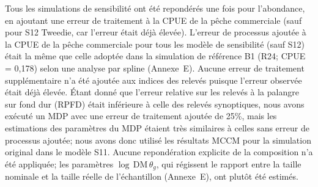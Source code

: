 \documentclass[11pt]{book}
\newcommand{\AppEqn}{Annexe~E}
\newcommand{\pc}{\%}
\begin{document}
Tous les simulations de sensibilit\'{e} ont \'{e}t\'{e} repond\'{e}r\'{e}s une fois pour l'abondance, en ajoutant une erreur de traitement \`{a} la CPUE de la p\^{e}che commerciale (sauf pour S12 Tweedie, car l'erreur \'{e}tait d\'{e}j\`{a} \'{e}lev\'{e}e). 
L'erreur de processus ajout\'{e}e \`{a} la CPUE de la p\^{e}che commerciale pour tous les mod\`{e}le de sensibilit\'{e} (sauf S12) \'{e}tait la m\^{e}me que celle adopt\'{e}e dans la simulation de r\'{e}f\'{e}rence B1 (R24; CPUE = 0,178) selon une analyse par spline (\AppEqn).
Aucune erreur de traitement suppl\'{e}mentaire n'a \'{e}t\'{e} ajout\'{e}e aux indices des relev\'{e}s puisque l'erreur observ\'{e}e \'{e}tait d\'{e}j\`{a} \'{e}lev\'{e}e. \'{E}tant donn\'{e} que l'erreur relative sur les relev\'{e}s \`{a} la palangre sur fond dur (RPFD) \'{e}tait inf\'{e}rieure \`{a} celle des relev\'{e}s synoptiques, nous avons ex\'{e}cut\'{e} un MDP avec une erreur de traitement ajout\'{e}e de 25\pc{}, mais les estimations des param\`{e}tres du MDP \'{e}taient tr\`{e}s similaires \`{a} celles sans erreur de processus ajout\'{e}e; nous avons donc utilis\'{e} les r\'{e}sultats MCCM pour la simulation original dans le mod\`{e}le S11.
Aucune repond\'{e}ration explicite de la composition n'a \'{e}t\'{e} appliqu\'{e}e; les param\`{e}tres $\log\,\text{DM}\,\theta_g$, qui r\'{e}gissent le rapport entre la taille nominale et la taille r\'{e}elle de l'\'{e}chantillon (\AppEqn), ont plut\^{o}t \'{e}t\'{e} estim\'{e}s.
\end{document}
